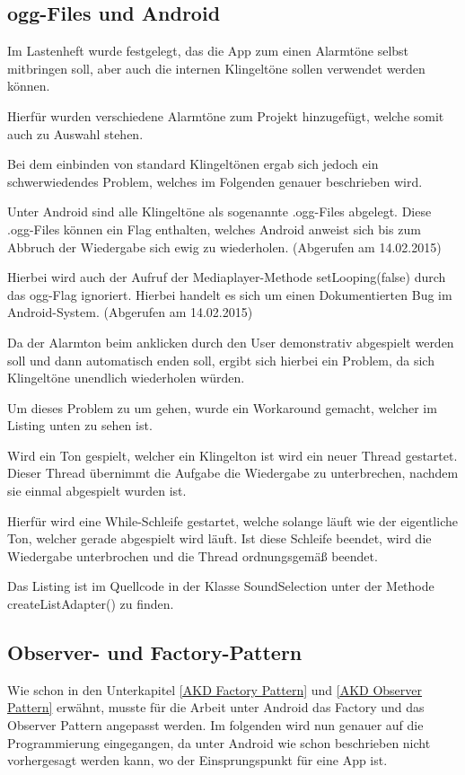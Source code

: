 
\cite{PlacesExample}

\subsection{ogg-Files und Android}
Im Lastenheft wurde festgelegt, das die App zum einen Alarmt\"one selbst mitbringen soll, aber auch die internen Klingelt\"one sollen verwendet werden k\"onnen.

Hierf\"ur wurden verschiedene Alarmt\"one zum Projekt hinzugef\"ugt, welche somit auch zu Auswahl stehen.

Bei dem einbinden von standard Klingelt\"onen ergab sich jedoch ein schwerwiedendes Problem, welches im Folgenden genauer beschrieben wird.

Unter Android sind alle Klingelt\"one als sogenannte .ogg-Files abgelegt. Diese .ogg-Files k\"onnen ein Flag enthalten, welches Android anweist sich bis zum Abbruch der Wiedergabe sich ewig zu wiederholen. 
\cite{oogStackOver} (Abgerufen am 14.02.2015)

Hierbei wird auch der Aufruf der Mediaplayer-Methode setLooping(false) durch das ogg-Flag ignoriert. Hierbei handelt es sich um einen Dokumentierten Bug im Android-System.
\cite{oggBug} (Abgerufen am 14.02.2015)

Da der Alarmton beim anklicken durch den User demonstrativ abgespielt werden soll und dann automatisch enden soll, ergibt sich hierbei ein Problem, da sich Klingelt\"one unendlich wiederholen w\"urden.

Um dieses Problem zu um gehen, wurde ein Workaround gemacht, welcher im Listing unten zu sehen ist.

Wird ein Ton gespielt, welcher ein Klingelton ist wird ein neuer Thread gestartet. Dieser Thread \"ubernimmt die Aufgabe die Wiedergabe zu unterbrechen, nachdem sie einmal abgespielt wurden ist.

Hierf\"ur wird eine While-Schleife gestartet, welche solange l\"auft wie der eigentliche Ton, welcher gerade abgespielt wird l\"auft. Ist diese Schleife beendet, wird die Wiedergabe unterbrochen und die Thread ordnungsgem\"a\ss{} beendet.

Das Listing ist im Quellcode in der Klasse SoundSelection unter der Methode createListAdapter() zu finden.



\subsection{Observer- und Factory-Pattern}
Wie schon in den Unterkapitel \ref{AKD Factory Pattern} und \ref{AKD Observer Pattern} erw\"ahnt, musste f\"ur die Arbeit unter Android das Factory und das Observer Pattern angepasst werden. Im folgenden wird nun genauer auf die Programmierung eingegangen, da unter Android wie schon beschrieben nicht vorhergesagt werden kann, wo der Einsprungspunkt f\"ur eine App ist.

